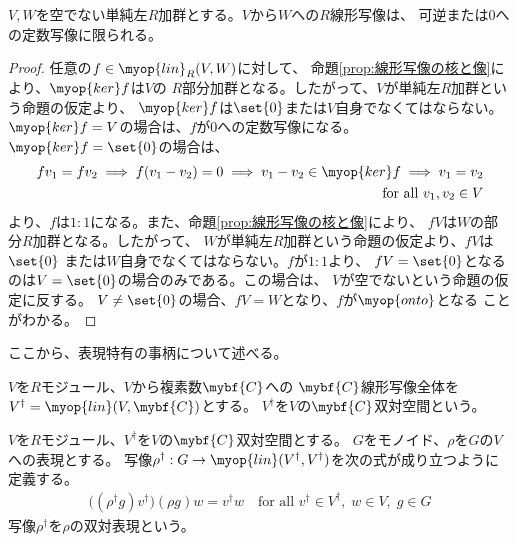 	\begin{proposition}[Schurの補題]\label{prop:Schurの補題} %
		$V,W$を空でない単純左$R$加群とする。$V$から$W$への$R$線形写像は、
		可逆または$0$への定数写像に限られる。
	\end{proposition} %
	\begin{proof} %
		任意の$f\in \myop{lin}_R(V,W)$に対して、
		命題\ref{prop:線形写像の核と像}により、$\myop{ker}f$は$V$の
		$R$部分加群となる。したがって、$V$が単純左$R$加群という命題の仮定より、
		$\myop{ker}f$は$\set{0}$または$V$自身でなくてはならない。
		$\myop{ker}f=V$の場合は、$f$が$0$への定数写像になる。
		$\myop{ker}f=\set{0}$の場合は、
		\begin{equation*}\begin{split} %
			fv_1=fv_2\implies f(v_1-v_2)=0\implies v_1-v_2\in\myop{ker}f
			\implies v_1=v_2 \\
			\quad\text{for all }v_1,v_2\in V
		\end{split}\end{equation*} %
		より、$f$は$1:1$になる。また、命題\ref{prop:線形写像の核と像}により、
		$fV$は$W$の部分$R$加群となる。したがって、
		$W$が単純左$R$加群という命題の仮定より、$fV$は$\set{0}$
		または$W$自身でなくてはならない。$f$が$1:1$より、
		$fV=\set{0}$となるのは$V=\set{0}$の場合のみである。この場合は、
		$V$が空でないという命題の仮定に反する。
		$V\neq\set{0}$の場合、$fV=W$となり、$f$が$\myop{onto}$となる
		ことがわかる。
	\end{proof} %

	ここから、表現特有の事柄について述べる。

	\begin{definition}[双対空間]\label{def:双対空間} %
		$V$を$R$モジュール、$V$から複素数$\mybf{C}$への
		$\mybf{C}$線形写像全体を$V^\dag=\myop{lin}(V,\mybf{C})$とする。
		$V^\dag$を$V$の$\mybf{C}$双対空間という。
	\end{definition} %

	\begin{definition}[双対表現]\label{def:双対表現} %
		$V$を$R$モジュール、$V^\dag$を$V$の$\mybf{C}$双対空間とする。
		$G$をモノイド、$\rho$を$G$の$V$への表現とする。
		写像$\rho^\dag:G\to \myop{lin}(V^\dag,V^\dag)$を次の式が成り立つように
		定義する。
		\begin{equation*}\begin{split} %
			\bigl((\rho^\dag g)v^\dag\bigr)(\rho g)w = v^\dag w
			\quad\text{for all }v^\dag \in V^\dag,\;w\in V,\; g\in G
		\end{split}\end{equation*} %
		写像$\rho^\dag$を$\rho$の双対表現という。
	\end{definition} %

